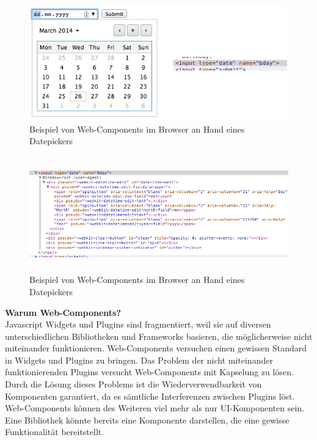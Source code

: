 \begin{figure}[h]
\centering
\includegraphics[height=5.0cm]{images/datepicker.jpg}
\caption[
Beispiel von Web-Components im Browser an Hand eines Datepickers, Urldate: 04.2014
\newline
\small\texttt{\url{https://s3.amazonaws.com/infinum.web.production/repository\_items/files/000/000/238/original/datepicker.jpg}}
]{Beispiel von Web-Components im Browser an Hand eines Datepickers}
\label{fig:3_Datepicker_Visuals}
\end{figure}

\begin{figure}[h]
\centering
\includegraphics[height=5.0cm]{images/datepicker_shadow_dom.jpg}
\caption[
Beispiel von Web-Components im Browser an Hand eines Datepickers, Urldate: 04.2014
\newline
\small\texttt{\url{https://s3.amazonaws.com/infinum.web.production/repository\_items/files/000/000/236/original/datepicker\_shadow\_dom.jpg}}
]{Beispiel von Web-Components im Browser an Hand eines Datepickers}
\label{fig:3_Datepicker_Source}
\end{figure}

\textbf{Warum Web-Components?}\\
Javascript Widgets und Plugins sind fragmentiert, weil sie auf diversen unterschiedlichen Bibliotheken und Frameworks basieren, die möglicherweise nicht miteinander funktionieren. Web-Components versuchen einen gewissen Standard in Widgets und Plugins zu bringen. Das Problem der nicht miteinander funktionierenden Plugins versucht Web-Components mit Kapselung zu lösen. Durch die Lösung dieses Problems ist die Wiederverwendbarkeit von Komponenten garantiert, da es sämtliche Interferenzen zwischen Plugins löst. Web-Components können des Weiteren viel mehr als nur UI-Komponenten sein. Eine Bibliothek könnte bereits eine Komponente darstellen, die eine gewisse Funktionalität bereitstellt.

